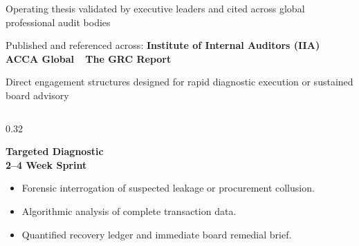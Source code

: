 \documentclass[aspectratio=169, 8pt]{beamer}
\begin{document}
\begin{frame}{Operating thesis validated by executive leaders and cited across global professional audit bodies}
    \vspace{0.15cm}
    \begin{center}
        \footnotesize \color{textMuted} Published and referenced across: \textbf{\color{obsidian} Institute of Internal Auditors (IIA)} \textbar\ \textbf{\color{obsidian} ACCA Global} \textbar\ \textbf{\color{obsidian} The GRC Report}
    \end{center}
\end{frame}

\begin{frame}{Direct engagement structures designed for rapid diagnostic execution or sustained board advisory}
    \vspace{-0.15cm}
    \begin{columns}[T]
        \begin{column}{0.32\textwidth}
            \begin{tcolorbox}[colback=cardBg, colframe=cardBorder, arc=1pt, boxrule=0.5pt, left=4pt, right=4pt, top=3pt, bottom=3pt]
                \textbf{\small \color{obsidian} Targeted Diagnostic} \\
                \vspace{0.05cm}
                \textbf{\scriptsize \color{terracotta} 2--4 Week Sprint}
            \end{tcolorbox}
            \begin{itemize}
                \setlength{\itemsep}{2pt}
                \item Forensic interrogation of suspected leakage or procurement collusion.
                \item Algorithmic analysis of complete transaction data.
                \item Quantified recovery ledger and immediate board remedial brief.
            \end{itemize}
        \end{column}
        

\end{columns}
\end{frame}
\end{document}
